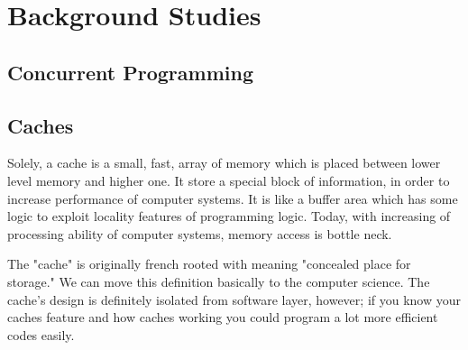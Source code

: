 \documentclass[informationsecurity]{gucmasterproject}
\begin{document}
\thesisdate{\gucmasterthesisdate}
\makefrontpages %



\chapter{Background Studies}
\section{Concurrent Programming }
\section{Caches}
Solely, a cache is a small, fast, array of memory which is placed between lower level memory and higher one.  It store a special block of information, in order to increase performance of computer systems. It is like a buffer area which has some logic to exploit locality features of programming logic. Today, with increasing of processing ability of computer systems, memory access is bottle neck. 

The "cache" is originally french rooted with meaning "concealed place for storage."\cite{sloss2004arm} We can move this definition basically to the computer science. The cache's design is definitely  isolated from software layer, however; if you know your caches feature and how caches working you could program a lot more efficient codes easily.
\end{document}
